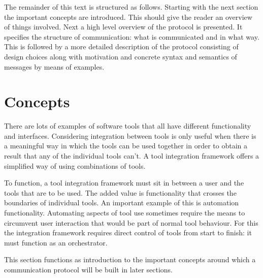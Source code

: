 \documentclass{article}
\begin{document}

  The remainder of this text is structured as follows. Starting with the next
  section the important concepts are introduced. This should give the reader an
  overview of things involved.  Next a high level overview of the protocol is
  presented. It specifies the structure of communication: what is communicated
  and in what way. This is followed by a more detailed description of the
  protocol consisting of design choices along with motivation and concrete
  syntax and semantics of messages by means of examples.


 \section{Concepts}

   There are lots of examples of software tools that all have different
   functionality and interfaces. Considering integration between tools is only
   useful when there is a meaningful way in which the tools can be used
   together in order to obtain a result that any of the individual tools can't.
   A tool integration framework offers a simplified way of using combinations
   of tools.
 
   To function, a tool integration framework must sit in between a user and the
   tools that are to be used. The added value is functionality that crosses the
   boundaries of individual tools. An important example of this is automation
   functionality. Automating aspects of tool use sometimes require the means to
   circumvent user interaction that would be part of normal tool behaviour.
   For this the integration framework requires direct control of tools from start to
   finish: it must function as an orchestrator.

   This section functions as introduction to the important concepts around
   which a communication protocol will be built in later sections.
\end{document}
